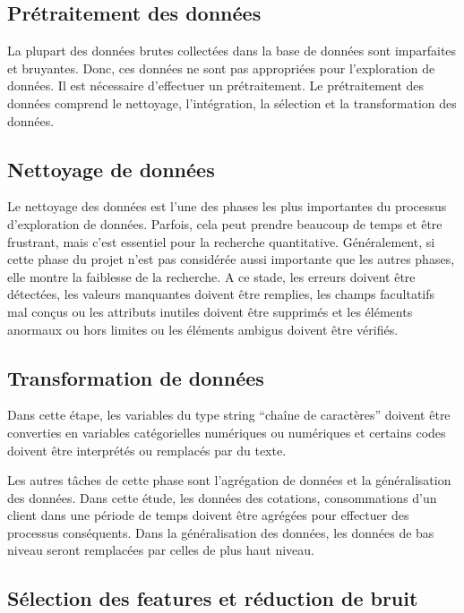 \documentclass[12pt]{article}
\begin{document}
{\subsection{Prétraitement des données}

La plupart des données brutes collectées dans la base de données sont imparfaites et bruyantes. Donc, ces données ne sont pas appropriées pour l'exploration de données. Il est nécessaire d'effectuer un prétraitement.
Le prétraitement des données comprend le nettoyage, l'intégration, la sélection et la transformation des données.

\subsection{Nettoyage de données}

Le nettoyage des données est l'une des phases les plus importantes du processus d'exploration de données. Parfois, cela peut prendre beaucoup de temps et être frustrant, mais c'est essentiel pour la recherche quantitative. 
Généralement, si cette phase du projet n'est pas considérée aussi importante que les autres phases, elle montre la faiblesse de la recherche. A ce stade, les erreurs doivent être détectées, les valeurs manquantes doivent être remplies, les champs facultatifs mal conçus ou les attributs inutiles doivent être supprimés et les éléments anormaux ou hors limites ou les éléments ambigus doivent être vérifiés.

\subsection{Transformation de données}

Dans cette étape, les variables du type string “chaîne de caractères” doivent être converties en variables catégorielles numériques ou numériques et certains codes doivent être interprétés ou remplacés par du texte. 

Les autres tâches de cette phase sont l'agrégation de données et la généralisation des données. Dans cette étude, les données des cotations, consommations  d'un client dans une période de temps doivent être agrégées pour effectuer des processus conséquents. 
Dans la généralisation des données, les données de bas niveau seront remplacées par celles de plus haut niveau.

\subsection{Sélection des features et réduction de bruit}

}
\end{document}
